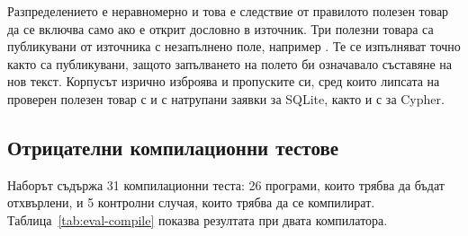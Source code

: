 Разпределението е неравномерно и това е следствие от правилото полезен товар да
се включва само ако е открит дословно в източник. Три полезни товара са
публикувани от източника с незапълнено поле, например \code{[RANDNUM]}. Те се
изпълняват точно както са публикувани, защото запълването на полето би означавало
съставяне на нов текст. Корпусът изрично изброява и пропуските си, сред които
липсата на проверен полезен товар с  и с натрупани заявки за SQLite,
както и с  за Cypher.

\subsection{Отрицателни компилационни тестове}
\label{sec:eval-compile}

Наборът съдържа 31 компилационни теста: 26 програми, които трябва да бъдат
отхвърлени, и 5 контролни случая, които трябва да се компилират.
Таблица~\ref{tab:eval-compile} показва резултата при двата компилатора.

